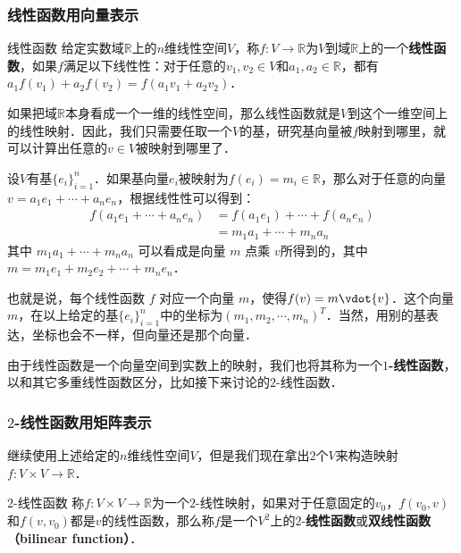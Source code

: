 \subsubsection{线性函数用向量表示}
\begin{definition}{线性函数}
给定实数域$\mathbb{R}$上的$n$维线性空间$V$，称$f:V\rightarrow \mathbb{R}$为$V$到域$\mathbb{R}$上的一个\textbf{线性函数}，如果$f$满足以下线性性：对于任意的${v}_1, {v}_2\in V$和$a_1, a_2\in\mathbb{R}$，都有$a_1f({v}_1)+a_2f({v}_2)=f(a_1{v}_1+a_2{v}_2)$．
\end{definition}

如果把域$\mathbb{R}$本身看成一个一维的线性空间，那么线性函数就是$V$到这个一维空间上的线性映射．因此，我们只需要任取一个$V$的基，研究基向量被$f$映射到哪里，就可以计算出任意的${v}\in V$被映射到哪里了．

设$V$有基$\{{e}_i\}_{i=1}^n$．如果基向量${e}_i$被映射为$f({e}_i)=m_i\in\mathbb{R}$，那么对于任意的向量${v}=a_1{e}_1+\cdots+a_n{e}_n$，根据线性性可以得到：
\begin{equation}
\begin{aligned}
f(a_1{e}_1+\cdots+a_n{e}_n)&=f(a_1{e}_1)+\cdots+f(a_n{e}_n)\\
&=m_1a_1+\cdots+m_na_n
\end{aligned}
\end{equation}
其中 $m_1a_1+\cdots+m_na_n$ 可以看成是向量 ${m}$ 点乘 ${v}$所得到的，其中${m}=m_1{e}_1+m_2{e}_2+\cdots+m_n{e}_n$．

也就是说，每个线性函数 $f$ 对应一个向量 ${m}$，使得$f({v})={m}\vdot{v}$．这个向量${m}$，在以上给定的基$\{{e}_i\}_{i=1}^n$中的坐标为$(m_1, m_2, \cdots, m_n)^T$．当然，用别的基表达，坐标也会不一样，但向量还是那个向量．

由于线性函数是一个向量空间到实数上的映射，我们也将其称为一个\textbf{$1$-线性函数}，以和其它多重线性函数区分，比如接下来讨论的$2$-线性函数．

\subsubsection{$2$-线性函数用矩阵表示}

继续使用上述给定的$n$维线性空间$V$，但是我们现在拿出$2$个$V$来构造映射$f:V\times V\rightarrow\mathbb{R}$．

\begin{definition}{$2$-线性函数}
称$f:V\times V\rightarrow\mathbb{R}$为一个$2$-线性映射，如果对于任意固定的${v}_0$，$f({v}_0, {v})$和$f({v}, {v}_0)$都是${v}$的线性函数，那么称$f$是一个$V^2$上的$2$-\textbf{线性函数}或\textbf{双线性函数（bilinear function）}．
\end{definition}

